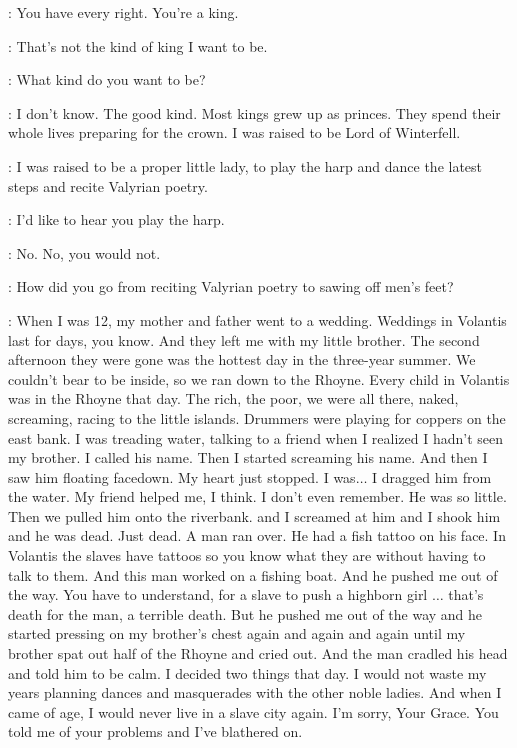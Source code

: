 \TALISA: You have every right. You're a king. 

\ROBB: That's not the kind of king I want to be. 

\TALISA: What kind do you want to be? 

\ROBB: I don't know. The good kind. Most kings grew up as princes. They spend their whole lives preparing for the crown. 
I was raised to be Lord of Winterfell. 

\TALISA: I was raised to be a proper little lady, to play the harp and dance the latest steps and recite Valyrian poetry. 

\ROBB: I'd like to hear you play the harp. 

\TALISA: No. No, you would not. 

\ROBB: How did you go from reciting Valyrian poetry to sawing off men's feet? 

\TALISA: When I was 12, my mother and father went to a wedding. Weddings in Volantis last for days, you know. And they left me with my little brother. The second afternoon they were gone was the hottest day in the three-year summer. We couldn't bear to be inside, so we ran down to the Rhoyne. Every child in Volantis was in the Rhoyne that day. The rich, the poor, we were all there, naked, screaming, racing to the little islands. Drummers were playing for coppers on the east bank. I was treading water, talking to a friend when I realized I hadn't seen my brother. I called his name. Then I started screaming his name. And then I saw him floating facedown. My heart just stopped. I was$\ldots$ I dragged him from the water. My friend helped me, I think. I don't even remember. He was so little. Then we pulled him onto the riverbank. and I screamed at him and I shook him and he was dead. Just dead. A man ran over. He had a fish tattoo on his face. In Volantis the slaves have tattoos so you know what they are without having to talk to them. And this man worked on a fishing boat. And he pushed me out of the way. You have to understand, for a slave to push a highborn girl $\ldots$ that's death for the man, a terrible death. But he pushed me out of the way and he started pressing on my brother's chest again and again and again until my brother spat out half of the Rhoyne and cried out. And the man cradled his head and told him to be calm. I decided two things that day. I would not waste my years planning dances and masquerades with the other noble ladies. And when I came of age, I would never live in a slave city again.  I'm sorry, Your Grace. You told me of your problems and I've blathered on. 

